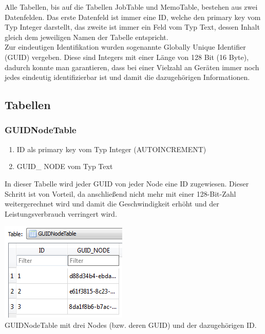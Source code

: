 \documentclass[12pt,a4paper]{report}
\begin{document}
\begin{onehalfspace}
Alle Tabellen, bis auf die Tabellen JobTable und MemoTable, bestehen aus zwei Datenfelden. Das erste Datenfeld ist immer eine ID, welche den primary key vom Typ Integer darstellt, das zweite ist immer ein Feld vom Typ Text, dessen Inhalt gleich dem jeweiligen Namen der Tabelle entspricht.\\

Zur eindeutigen Identifikation wurden sogenannte Globally Unique Identifier (GUID) vergeben. Diese sind Integers mit einer Länge von 128 Bit (16 Byte), dadurch konnte man garantieren, dass bei einer Vielzahl an Geräten immer noch jedes eindeutig identifizierbar ist und damit die dazugehörigen Informationen.
\subsection{Tabellen}
\subsubsection{GUIDNodeTable}
\begin{enumerate}
\item ID als primary key vom Typ Integer (AUTOINCREMENT)
\item GUID\_ NODE vom Typ Text
\end{enumerate}
In dieser Tabelle wird jeder GUID von jeder Node eine ID zugewiesen. Dieser Schritt ist von Vorteil, da anschließend nicht mehr mit einer 128-Bit-Zahl weitergerechnet wird und damit die Geschwindigkeit erhöht und der Leistungsverbrauch verringert wird.
\begin{center}
\includegraphics[scale=0.8]{img/db-tb-guid-node.png}\\
GUIDNodeTable mit drei Nodes (bzw. deren GUID) und der dazugehörigen ID.
\end{center}

\end{onehalfspace}
\end{document}
